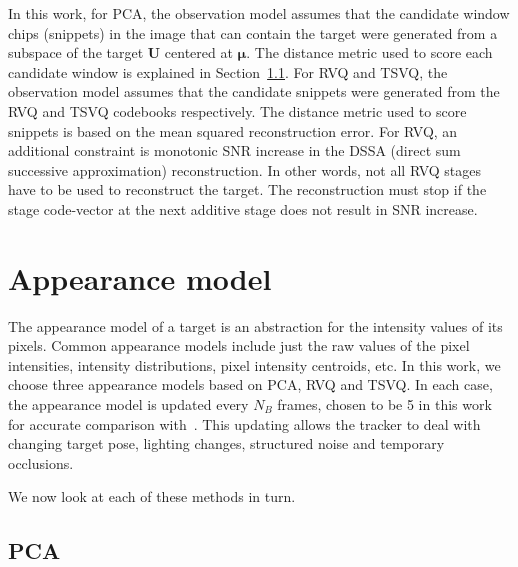 In this work, for PCA, the observation model assumes that the candidate window chips (snippets) in the image that can contain the target were generated from a subspace of the target $\mathbf{U}$ centered at $\mathbf{\mu}$.  The distance metric used to score each candidate window is explained in Section~\ref{Sec:Chap5_PCA}.  For RVQ and TSVQ, the observation model assumes that the candidate snippets were generated from the RVQ and TSVQ codebooks respectively.  The distance metric used to score snippets is based on the mean squared reconstruction error.  For RVQ, an additional constraint is monotonic SNR increase in the DSSA (direct sum successive approximation) reconstruction.  In other words, not all RVQ stages have to be used to reconstruct the target.  The reconstruction must stop if the stage code-vector at the next additive stage does not result in SNR increase.




\section{Appearance model}
\label{Sec:RVQ_trk_appearance_model}
The appearance model of a target is an abstraction for the intensity values of its pixels.  Common appearance models include just the raw values of the pixel intensities, intensity distributions, pixel intensity centroids, etc.  In this work, we choose three appearance models based on PCA, RVQ and TSVQ.  In each case, the appearance model is updated every $N_B$ frames, chosen to be 5 in this work for accurate comparison with~\cite{2008_JNL_subspaceTRK_Ross}.    This updating allows the tracker to deal with changing target pose, lighting changes, structured noise and temporary occlusions.   





We now look at each of these methods in turn.

\subsection{PCA}
\label{Sec:Chap5_PCA}

